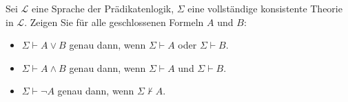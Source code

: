 
\begin{exercise}[113]

Sei $\mathscr{L}$ eine Sprache der Prädikatenlogik, $\Sigma$ eine vollständige
konsistente Theorie in $\mathscr{L}$. Zeigen Sie für alle geschlossenen Formeln
$A$ und $B$:
\begin{itemize}
  \item $\Sigma \vdash A \lor B$ genau dann, wenn $\Sigma \vdash A$ oder $\Sigma \vdash B$.
  \item $\Sigma \vdash A \land B$ genau dann, wenn $\Sigma \vdash A$ und $\Sigma \vdash B$.
  \item $\Sigma \vdash \neg A$ genau dann, wenn $\Sigma \nvdash A$.
\end{itemize}
\end{exercise}


\begin{solution}

\phantom{}

\end{solution}

